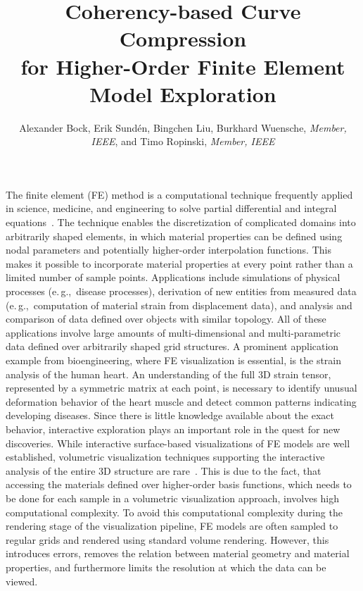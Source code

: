 \documentclass[review,journal]{vgtc}         %
\title{Coherency-based Curve Compression\\ for Higher-Order Finite Element Model Exploration}
\author{Alexander Bock, Erik Sund\'en, Bingchen Liu, Burkhard Wuensche, \textit{Member, IEEE}, and Timo Ropinski, \textit{Member, IEEE}}
\begin{document}

\label{sec:introduction}

\maketitle

The finite element (FE) method is a computational technique frequently applied in science, medicine, and engineering to solve partial differential and integral equations~\cite{Young00}. The technique enables the discretization of complicated domains into arbitrarily shaped elements, in which material properties can be defined using nodal parameters and potentially higher-order interpolation functions. This makes it possible to incorporate material properties at every point rather than a limited number of sample points. Applications include simulations of physical processes (e.\,g.,~disease processes), derivation of new entities from measured data (e.\,g.,~computation of material strain from displacement data), and analysis and comparison of data defined over objects with similar topology. All of these applications involve large amounts of multi-dimensional and multi-parametric data defined over arbitrarily shaped grid structures. A prominent application example from bioengineering, where FE visualization is essential, is the strain analysis of the human heart. An understanding of the full 3D strain tensor, represented by a symmetric matrix at each point, is necessary to identify unusual deformation behavior of the heart muscle and detect common patterns indicating developing diseases. Since there is little knowledge available about the exact behavior, interactive exploration plays an important role in the quest for new discoveries. While interactive surface-based visualizations of FE models are well established, volumetric visualization techniques supporting the interactive analysis of the entire 3D structure are rare~\cite{Wihelms90}. This is due to the fact, that accessing the materials defined over higher-order basis functions, which needs to be done for each sample in a volumetric visualization approach, involves high computational complexity. To avoid this computational complexity during the rendering stage of the visualization pipeline, FE models are often sampled to regular grids and rendered using standard volume rendering. However, this introduces errors, removes the relation between material geometry and material properties, and furthermore limits the resolution at which the data can be viewed.
\end{document}
